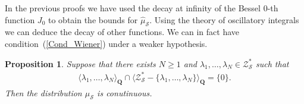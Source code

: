 \documentclass[a4paper,10pt]{amsart}
\theoremstyle{plain}
\newtheorem{prop}[theo]{Proposition}
\theoremstyle{definition}
\begin{document}
In the previous proofs we have used the decay at infinity of the Bessel $0$-th function $J_{0}$ 
to obtain the bounds for $\hat{\mu}_{\mathcal{S}}$.
Using the theory of oscillatory integrals we can deduce the decay of other functions.
We can in fact have condition~(\ref{Cond_Wiener}) under a weaker hypothesis.
\begin{prop}\label{Prop_SomeSelfSufficience}
Suppose that there exists $N\geq 1$ and $\lambda_{1},\ldots,\lambda_{N} \in \mathcal{Z}_{\mathcal{S}}^{*}$ such that 
\begin{align*}
\langle\lambda_{1},\ldots,\lambda_{N}\rangle_{\mathbf{Q}} \cap \langle \mathcal{Z}_{\mathcal{S}}^{*} - \lbrace \lambda_{1},\ldots,\lambda_{N}  \rbrace \rangle_{\mathbf{Q}} = \lbrace 0 \rbrace.
\end{align*}
Then the distribution $\mu_{\mathcal{S}}$ is conutinuous.
\end{prop}
\end{document}
